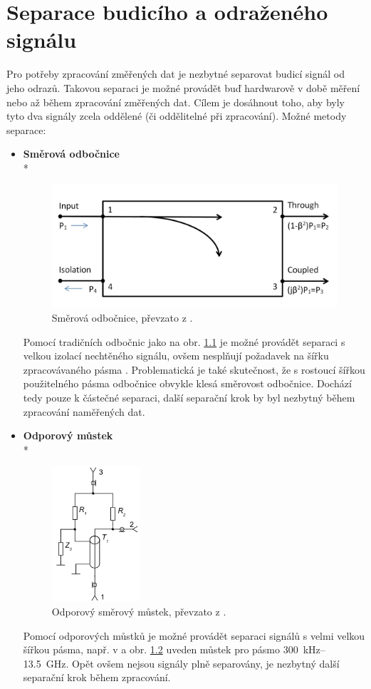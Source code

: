 \chapter{Separace budicího a odraženého signálu}
Pro potřeby zpracování změřených dat je nezbytné separovat budicí signál od jeho odrazů. Takovou separaci je možné provádět buď hardwarově v době měření nebo až během zpracování změřených dat. Cílem je dosáhnout toho, aby byly tyto dva signály zcela oddělené (či oddělitelné při zpracování). Možné metody separace:
\begin{itemize}
	\item
	\textbf{Směrová odbočnice}\\*	
	\begin{figure}[htbp]\includegraphics[width=.8\textwidth,keepaspectratio]{images/directionalcoupler.png}\caption{Směrová odbočnice, převzato z \cite{widebandcouplers}.}\label{directionalcoupler}\end{figure}	

	Pomocí tradičních odbočnic jako na obr. \ref{directionalcoupler} je možné provádět separaci s velkou izolací nechtěného signálu, ovšem nesplňují požadavek na šířku zpracovávaného pásma \cite{widebandcouplers}. Problematická je také skutečnost, že s rostoucí šířkou použitelného pásma odbočnice obvykle klesá směrovost odbočnice. Dochází tedy pouze k částečné separaci, další separační krok by byl nezbytný během zpracování naměřených dat.
	
	\item
	\textbf{Odporový můstek}\\*	
	\begin{figure}[htbp]\includegraphics[width=\textwidth,height=5cm,keepaspectratio]{images/resistivebridge.png}\caption{Odporový směrový můstek, převzato z \cite{resistivedirectionalbridge}.}\label{resistivebridge}\end{figure}	
	Pomocí odporových můstků je možné provádět separaci signálů s velmi velkou šířkou pásma, např. v \cite{resistivedirectionalbridge} a obr. \ref{resistivebridge} uveden můstek pro pásmo \SI{300}{\kilo\hertz}--\SI{13.5}{\giga\hertz}. Opět ovšem nejsou signály plně separovány, je nezbytný další separační krok během zpracování.
	

\end{itemize}
